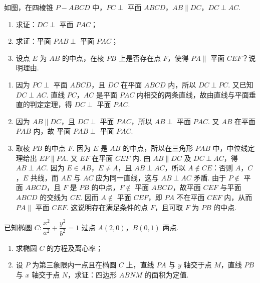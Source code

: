 \begin{problem}
如图，在四棱锥 \(P-ABCD\) 中，\(PC\perp\) 平面 \(ABCD\)，\(AB\parallel DC\)，\(DC\perp AC\).

\begin{enumerate}
\item 求证：\(DC\perp\) 平面 \(PAC\)；
\item 求证：平面 \(PAB\perp\) 平面 \(PAC\)；
\item 设点 \(E\) 为 \(AB\) 的中点，在棱 \(PB\) 上是否存在点 \(F\)，使得 \(PA\parallel\) 平面 \(CEF\)？说明理由.
\end{enumerate}

\end{problem}

\begin{solution}
\begin{enumerate}
\item 因为 \(PC\perp\) 平面 \(ABCD\)，且 \(DC\) 在平面 \(ABCD\) 内，所以 \(DC\perp PC\). 又已知 \(DC\perp AC\). 直线 \(PC\)，\(AC\) 是平面 \(PAC\) 内相交的两条直线，故由直线与平面垂直的判定定理，得
\(DC\perp\) 平面 \(PAC\).

\item 因为 \(AB\parallel DC\)，且 \(DC\perp\) 平面 \(PAC\)，所以 \(AB\perp\) 平面 \(PAC\). 又 \(AB\) 在平面 \(PAB\) 内，故
平面 \(PAB\perp\) 平面 \(PAC\).

\item 取棱 \(PB\) 的中点 \(F\). 因为 \(E\) 是 \(AB\) 的中点，所以在三角形 \(PAB\) 中，中位线定理给出
\(EF\parallel PA\).
又 \(EF\) 在平面 \(CEF\) 内. 由 \(AB\parallel DC\) 及 \(DC\perp AC\)，得 \(AB\perp AC\). 因为 \(E\in AB\)，\(E\ne A\)，且 \(AB\perp AC\)，所以 \(A\notin CE\)：否则 \(A\)，\(C\)，\(E\) 共线，而 \(AE\) 与 \(AC\) 应为同一直线，这与 \(AB\perp AC\) 矛盾. 由于 \(P\notin\) 平面 \(ABCD\)，且 \(F\) 是 \(PB\) 的中点，\(F\notin\) 平面 \(ABCD\)，故平面 \(CEF\) 与平面 \(ABCD\) 的交线为 \(CE\). 因而 \(A\notin\) 平面 \(CEF\)，即 \(PA\) 不在平面 \(CEF\) 内，从而
\(PA\parallel\) 平面 \(CEF\).
这说明存在满足条件的点 \(F\)，且可取 \(F\) 为 \(PB\) 的中点.
\end{enumerate}
\end{solution}

\begin{problem}
已知椭圆 \(C:\dfrac{x^2}{a^2}+\dfrac{y^2}{b^2}=1\) 过点 \(A(2,0)\)，\(B(0,1)\) 两点.

\begin{enumerate}
\item 求椭圆 \(C\) 的方程及离心率；
\item 设 \(P\) 为第三象限内一点且在椭圆 \(C\) 上，直线 \(PA\) 与 \(y\) 轴交于点 \(M\)，直线 \(PB\) 与 \(x\) 轴交于点 \(N\)，求证：四边形 \(ABNM\) 的面积为定值.
\end{enumerate}

\end{problem}

